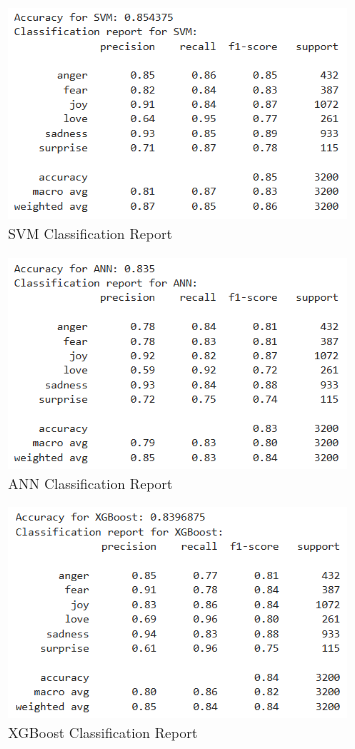 \begin{figure}[h!]
\centering
\includegraphics[width=0.8\textwidth]{svm_result.png}
\caption{SVM Classification Report}
\label{fig:svm}
\end{figure}

\begin{figure}[h!]
\centering
\includegraphics[width=0.8\textwidth]{ann_result.png}
\caption{ANN Classification Report}
\label{fig:ann}
\end{figure}

\begin{figure}[h!]
\centering
\includegraphics[width=0.8\textwidth]{xgboost_result.png}
\caption{XGBoost Classification Report}
\label{fig:xgboost}
\end{figure}

